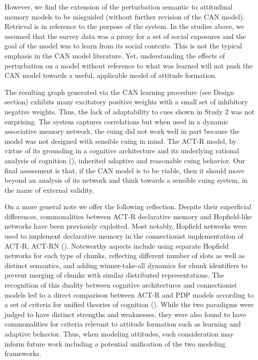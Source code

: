 \documentclass[10pt,letterpaper]{article}
\begin{document}
However, we find the extension of the perturbation semantic to attitudinal memory models to be misguided (without further revision of the CAN model).  Retrieval is in reference to the purpose of the system.  In the studies above, we assumed that the survey data was a proxy for a set of social exposures and the goal of the model was to learn from its social contexts.  This is not the typical emphasis in the CAN model literature. Yet, understanding the effects of perturbation on a model without reference to what was learned will not push the CAN model towards a useful, applicable model of attitude formation.  

The resulting graph generated via the CAN learning procedure (see Design section) exhibits many excitatory positive weights with a small set of inhibitory negative weights. Thus, the lack of adaptability to cues shown in Study 2 was not surprising. The system captures correlations but when used in a dynamic associative memory network, the cuing did not work well in part because the model was not designed with sensible cuing in mind. The ACT-R model, by virtue of its grounding in a cognitive architecture and its underlying rational analysis of cognition (\cite{anderson1990}), inherited adaptive and reasonable cuing behavior.  Our final assessment is that, if the CAN model is to be viable, then it should move beyond an analysis of its network and think towards a sensible cuing system, in the name of external validity. 

On a more general note we offer the following reflection.  Despite their superficial differences, commonalities between ACT-R declarative memory and Hopfield-like networks have been previously exploited. Most notably, Hopfield networks were used to implement declarative memory in the connectionist implementation of ACT-R, ACT-RN (\cite{lebiere1993connectionist}). Noteworthy aspects include using separate Hopfield networks for each type of chunks, reflecting different number of slots as well as distinct semantics, and adding winner-take-all dynamics for chunk identifiers to prevent merging of chunks with similar distributed representations.  The recognition of this duality between cognitive architectures and connectionist models led to a direct comparison between ACT-R and PDP models according to a set of criteria for unified theories of cognition (\cite{anderson2003newell}). While the two paradigms were judged to have distinct strengths and weaknesses, they were also found to have commonalities for criteria relevant to attitude formation such as learning and adaptive behavior. Thus, when modeling attitudes, such consideration may inform future work including a potential unification of the two modeling frameworks.


\printbibliography 
\end{document}
